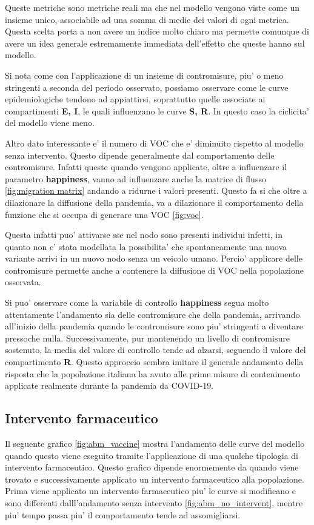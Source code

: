 Queste metriche sono metriche reali ma che nel modello vengono viste come un insieme unico, associabile 
ad una somma di medie dei valori di ogni metrica. Questa scelta porta a non avere un indice molto chiaro
ma permette comunque di avere un idea generale estremamente immediata dell'effetto che queste hanno sul modello.

Si nota come con l'applicazione di un insieme di contromisure, piu' o meno stringenti a seconda del periodo osservato, 
possiamo osservare come le curve epidemiologiche tendono ad appiattirsi, soprattutto quelle associate ai compartimenti 
\textbf{E, I}, le quali influenzano le curve \textbf{S, R}. In questo caso la ciclicita' del modello viene meno. 

Altro dato interessante e' il numero di VOC che e' diminuito rispetto al modello senza intervento.
Questo dipende generalmente dal comportamento delle contromisure. Infatti queste quando vengono applicate, 
oltre a influenzare il parametro \textbf{happiness}, vanno ad influenzare anche la matrice di flusso \ref{fig:migration matrix}
andando a ridurne i valori presenti. Questo fa si che oltre a dilazionare la diffusione della pandemia, 
va a dilazionare il comportamento della funzione che si occupa di generare una VOC \ref{fig:voc}. 

Questa infatti puo' attivarse sse nel nodo sono presenti individui infetti, in quanto non e' stata modellata la 
possibilita' che spontaneamente una nuova variante arrivi in un nuovo nodo senza un veicolo umano. Percio' 
applicare delle contromisure permette anche a contenere la diffusione di VOC nella popolazione osservata.

Si puo' osservare come la variabile di controllo \textbf{happiness} segua molto attentamente l'andamento sia delle 
contromisure che della pandemia, arrivando all'inizio della pandemia quando le contromisure sono piu' stringenti 
a diventare pressoche nulla. Successivamente, pur mantenendo un livello di contromisure sostenuto, la media
del valore di controllo tende ad alzarsi, seguendo il valore del compartimento \textbf{R}. Questo approccio sembra 
imitare il generale andamento della risposta che la popolazione italiana ha avuto alle prime misure di contenimento 
applicate realmente durante la pandemia da COVID-19.

\subsection{Intervento farmaceutico}
Il seguente grafico \ref{fig:abm_vaccine} mostra l'andamento delle curve del modello
quando questo viene eseguito tramite l'applicazione di una qualche tipologia di intervento farmaceutico.
Questo grafico dipende enormemente da quando viene trovato e successivamente applicato un intervento 
farmaceutico alla popolazione. Prima viene applicato un intervento farmaceutico piu' le curve si modificano 
e sono differenti dalll'andamento senza intervento \ref{fig:abm_no_intervent}, mentre piu' tempo passa piu'
il comportamento tende ad assomigliarsi.

